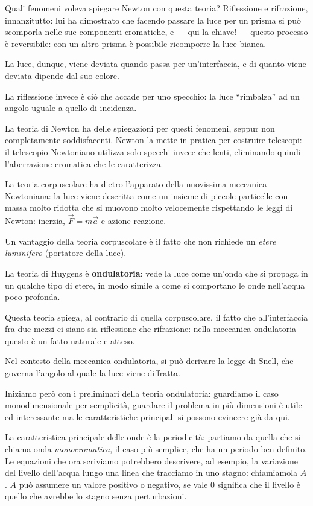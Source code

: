 \documentclass{article}
\begin{document}
Quali fenomeni voleva spiegare Newton con questa teoria?
Riflessione e rifrazione, innanzitutto: lui ha dimostrato che facendo passare la luce per un prisma si può scomporla nelle sue componenti cromatiche, e --- qui la chiave! --- questo processo è reversibile: con un altro prisma è possibile ricomporre la luce bianca.

La luce, dunque, viene deviata quando passa per un'interfaccia, e di quanto viene deviata dipende dal suo colore. 

La riflessione invece è ciò che accade per uno specchio: la luce ``rimbalza'' ad un angolo uguale a quello di incidenza.

La teoria di Newton ha delle spiegazioni per questi fenomeni, seppur non completamente soddisfacenti.
Newton la mette in pratica per costruire telescopi: il telescopio Newtoniano utilizza solo specchi invece che lenti, eliminando quindi l'aberrazione cromatica che le caratterizza. 

La teoria corpuscolare ha dietro l'apparato della nuovissima meccanica Newtoniana: la luce viene descritta come un insieme di piccole particelle con massa molto ridotta che si muovono molto velocemente rispettando le leggi di Newton: inerzia, \(\vec{F} = m \vec{a}\) e azione-reazione.

Un vantaggio della teoria corpuscolare è il fatto che non richiede un \emph{etere luminifero} (portatore della luce). 

La teoria di Huygens è \textbf{ondulatoria}: vede la luce come un'onda che si propaga in un qualche tipo di etere, in modo simile a come si comportano le onde nell'acqua poco profonda.

Questa teoria spiega, al contrario di quella corpuscolare, il fatto che all'interfaccia fra due mezzi ci siano sia riflessione che rifrazione: nella meccanica ondulatoria questo è un fatto naturale e atteso.

Nel contesto della meccanica ondulatoria, si può derivare la legge di Snell, che governa l'angolo al quale la luce viene diffratta. 

Iniziamo però con i preliminari della teoria ondulatoria: guardiamo il caso monodimensionale per semplicità, guardare il problema in più dimensioni è utile ed interessante ma le caratteristiche principali si possono evincere già da qui. 

La caratteristica principale delle onde è la periodicità: partiamo da quella che si chiama onda \emph{monocromatica}, il caso più semplice, che ha un periodo ben definito.
Le equazioni che ora scriviamo potrebbero descrivere, ad esempio, la variazione del livello dell'acqua lungo una linea che tracciamo in uno stagno: chiamiamola \(A\).
\(A\) può assumere un valore positivo o negativo, se vale 0 significa che il livello è quello che avrebbe lo stagno senza perturbazioni.
\end{document}
